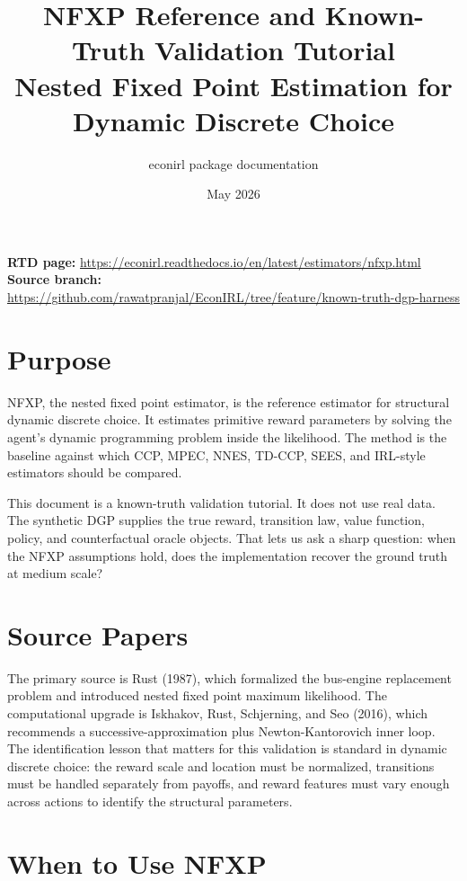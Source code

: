 \documentclass[10pt]{article}
\title{NFXP Reference and Known-Truth Validation Tutorial\\[3pt]
\large Nested Fixed Point Estimation for Dynamic Discrete Choice}
\author{econirl package documentation}
\date{May 2026}
\begin{document}
\maketitle

\begin{center}
\small
\textbf{RTD page:}
\url{https://econirl.readthedocs.io/en/latest/estimators/nfxp.html}
\quad
\textbf{Source branch:}
\url{https://github.com/rawatpranjal/EconIRL/tree/feature/known-truth-dgp-harness}
\end{center}

\section{Purpose}

NFXP, the nested fixed point estimator, is the reference estimator for structural
dynamic discrete choice. It estimates primitive reward parameters by solving the
agent's dynamic programming problem inside the likelihood. The method is the
baseline against which CCP, MPEC, NNES, TD-CCP, SEES, and IRL-style estimators
should be compared.

This document is a known-truth validation tutorial. It does not use real data.
The synthetic DGP supplies the true reward, transition law, value function,
policy, and counterfactual oracle objects. That lets us ask a sharp question:
when the NFXP assumptions hold, does the implementation recover the ground
truth at medium scale?

\section{Source Papers}

The primary source is Rust (1987), which formalized the bus-engine replacement
problem and introduced nested fixed point maximum likelihood. The computational
upgrade is Iskhakov, Rust, Schjerning, and Seo (2016), which recommends a
successive-approximation plus Newton-Kantorovich inner loop. The identification
lesson that matters for this validation is standard in dynamic discrete choice:
the reward scale and location must be normalized, transitions must be handled
separately from payoffs, and reward features must vary enough across actions to
identify the structural parameters.

\section{When to Use NFXP}
\end{document}
